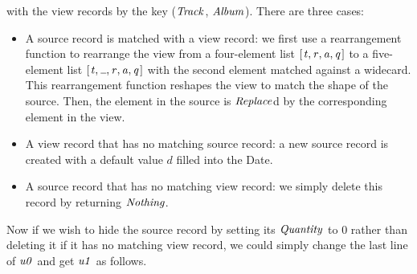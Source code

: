 with the view records by the key (\ensuremath{\Conid{Track}}, \ensuremath{\Conid{Album}}).
There are three cases:
\begin{itemize}

\item A source record is matched with a view record: we first use a
rearrangement function to rearrange the view from a
four-element list \ensuremath{[\mskip1.5mu \Varid{t},\Varid{r},\Varid{a},\Varid{q}\mskip1.5mu]} to a five-element list \ensuremath{[\mskip1.5mu \Varid{t},\anonymous ,\Varid{r},\Varid{a},\Varid{q}\mskip1.5mu]}
with the second element matched against a widecard.  This rearrangement
function reshapes the view to match the shape of the source.  Then,
the element in the source is \ensuremath{\Conid{Replace}}d by the corresponding element
in the view.

\item A view record that has no matching source record: a new source
record is created with a default value $d$ filled into the
Date.

\item A source record that has no matching view record: we simply
delete this record by returning \ensuremath{\Conid{Nothing}}.

\end{itemize}

Now if we wish to hide the source record by setting its \ensuremath{\Conid{Quantity}} to \ensuremath{\mathrm{0}}
rather than deleting it if it has no matching view record,
we could simply change the last line of \ensuremath{\Varid{u0}} and get \ensuremath{\Varid{u1}} as follows.

